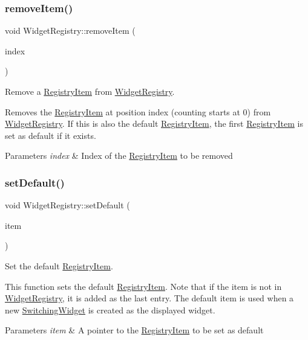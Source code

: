 \subsubsection{\texorpdfstring{remove\+Item()}{removeItem()}\hspace{0.1cm}{\footnotesize\ttfamily [2/2]}}
{\footnotesize\ttfamily void Widget\+Registry\+::remove\+Item (\begin{DoxyParamCaption}\item[{int}]{index }\end{DoxyParamCaption})}



Remove a \hyperlink{class_registry_item}{Registry\+Item} from \hyperlink{class_widget_registry}{Widget\+Registry}. 

Removes the \hyperlink{class_registry_item}{Registry\+Item} at position index (counting starts at 0) from \hyperlink{class_widget_registry}{Widget\+Registry}. If this is also the default \hyperlink{class_registry_item}{Registry\+Item}, the first \hyperlink{class_registry_item}{Registry\+Item} is set as default if it exists. 
\begin{DoxyParams}{Parameters}
{\em index} & Index of the \hyperlink{class_registry_item}{Registry\+Item} to be removed \\
\hline
\end{DoxyParams}
\hypertarget{class_widget_registry_aa77ed2504c7e241eabf49ff4e1088fa2}{}\label{class_widget_registry_aa77ed2504c7e241eabf49ff4e1088fa2} 
\subsubsection{\texorpdfstring{set\+Default()}{setDefault()}\hspace{0.1cm}{\footnotesize\ttfamily [1/2]}}
{\footnotesize\ttfamily void Widget\+Registry\+::set\+Default (\begin{DoxyParamCaption}\item[{\hyperlink{class_registry_item}{Registry\+Item} $\ast$}]{item }\end{DoxyParamCaption})}



Set the default \hyperlink{class_registry_item}{Registry\+Item}. 

This function sets the default \hyperlink{class_registry_item}{Registry\+Item}. Note that if the item is not in \hyperlink{class_widget_registry}{Widget\+Registry}, it is added as the last entry. The default item is used when a new \hyperlink{class_switching_widget}{Switching\+Widget} is created as the displayed widget. 
\begin{DoxyParams}{Parameters}
{\em item} & A pointer to the \hyperlink{class_registry_item}{Registry\+Item} to be set as default \\
\hline
\end{DoxyParams}
\hypertarget{class_widget_registry_a3d0fa9207009556d5218a3dda73349d0}{}\label{class_widget_registry_a3d0fa9207009556d5218a3dda73349d0} 
